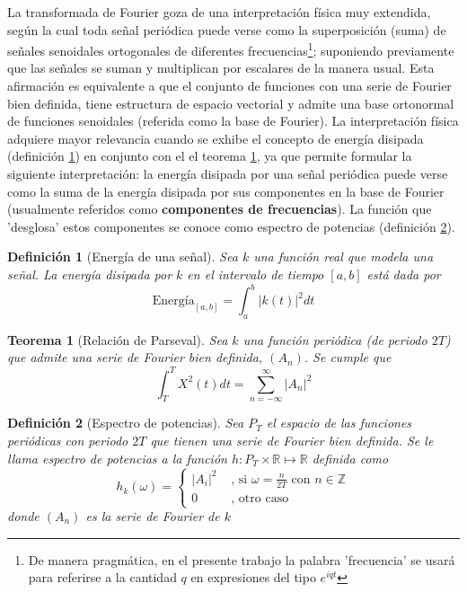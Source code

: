 \documentclass[12pt,a4paper]{mitthesis}
\newtheorem{defn}{Definici\'on}
\newtheorem{thrm}{Teorema}
\newcommand{\abso}[1]{\left| #1 \right|}
\begin{document}
La transformada de Fourier goza de una interpretación física muy extendida, seg\'un la cual toda 
se\~nal peri\'odica puede verse como la superposici\'on (suma) de se\~nales senoidales 
ortogonales de diferentes frecuencias\footnote{De manera pragm\'atica, en el presente trabajo la 
palabra  'frecuencia' se usar\'a para referirse a la cantidad $q$ en expresiones del tipo 
$e^{i q t}$}; suponiendo previamente que las se\~nales se suman y multiplican por escalares de la 
manera usual. 
Esta afirmaci\'on es equivalente a que el conjunto de funciones con una serie de Fourier bien 
definida, tiene estructura de espacio vectorial y admite una base ortonormal de funciones 
senoidales (referida como la base de Fourier). 
La interpretaci\'on f\'isica adquiere mayor relevancia cuando se exhibe el concepto de energ\'ia
disipada (definici\'on \ref{energia}) en conjunto con el el teorema \ref{parseval_serie}, ya que 
permite formular la siguiente interpretaci\'on: la energ\'ia disipada por una se\~nal peri\'odica 
puede verse como la suma de la energ\'ia disipada por sus componentes en la base de Fourier 
(usualmente referidos como \textbf{componentes de frecuencias}).
La funci\'on que 'desglosa' estos componentes se conoce como espectro de potencias (definici\'on 
\ref{espec}).

\begin{defn}[Energ\'ia de una se\~nal]
Sea $k$ una funci\'on real que modela una se\~nal. La energ\'ia disipada por $k$ en el intervalo de
tiempo $[a,b]$ est\'a dada por
\begin{equation*}
\text{Energ\'ia}_{[a,b]} = \int_{a}^{b} \abso{k\left(t\right)}^{2} dt
\end{equation*}
\label{energia}
\end{defn}

\begin{thrm}[Relaci\'on de Parseval]
Sea $k$ una funci\'on peri\'odica (de periodo $2T$) que admite una serie de Fourier bien definida,
$(A_n)$. Se cumple que
\begin{equation*}
\int_T^{T} X^{2}(t) dt = \sum_{n=-\infty}^{\infty} \abso{A_n}^{2}
\end{equation*}
\label{parseval_serie}
\end{thrm}

\newpage

\begin{defn}[Espectro de potencias]
Sea $P_T$ el espacio de las funciones peri\'odicas con periodo $2T$ que tienen una serie de Fourier 
bien definida. Se le llama espectro de potencias a la funci\'on 
$h: P_T \times \mathbb{R} \mapsto \mathbb{R}$ definida como
\begin{equation*}
h_k(\omega) = 
\begin{cases}
\abso{A_i}^{2} & \text{ , si } \omega = \frac{n}{2T} \text{   con } n\in \mathbb{Z} \\
0 & \text{ ,  otro caso}
\end{cases}
\end{equation*}
donde $\left( A_n \right)$ es la serie de Fourier de $k$
\label{espec}
\end{defn}
\end{document}
